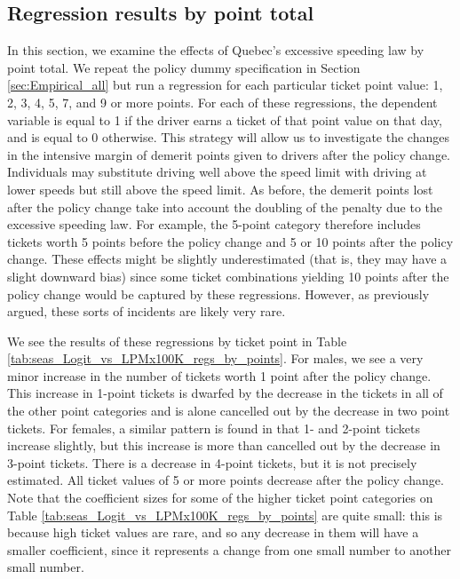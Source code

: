 \subsection{Regression results by point total}
\label{sec:Empirical_by_pts}

In this section, we examine the effects of Quebec’s excessive speeding law by point total. 
We repeat the policy dummy specification in 
Section \ref{sec:Empirical_all} 
but run a regression for each particular ticket point value: 1, 2, 3, 4, 5, 7, and 9 or more points. 
For each of these regressions, the dependent variable is equal to 1 
if the driver earns a ticket of that point value on that day, and is equal to 0 otherwise. 
This strategy will allow us to investigate the changes in the intensive margin of 
demerit points given to drivers after the policy change. 
Individuals may substitute driving well above the speed limit with driving at lower speeds 
but still above the speed limit. 
As before, the demerit points lost after the policy change take into account 
the doubling of the penalty due to the excessive speeding law. 
For example, the 5-point category therefore includes tickets 
worth 5 points before the policy change and 5 or 10 points after the policy change. 
These effects might be slightly underestimated (that is, they may have a slight downward bias) 
since some ticket combinations yielding 10 points after the policy change 
would be captured by these regressions. 
However, as previously argued, these sorts of incidents are likely very rare. 





We see the results of these regressions by ticket point in 
Table \ref{tab:seas_Logit_vs_LPMx100K_regs_by_points}. 
For males, we see a very minor increase in the number of tickets 
worth 1 point after the policy change. 
This increase in 1-point tickets is dwarfed by the decrease in the tickets 
in all of the other point categories and is alone cancelled out 
by the decrease in two point tickets. 
For females, a similar pattern is found in that 1- and 2-point tickets increase slightly,
but this increase is more than cancelled out by the decrease in 3-point tickets. 
There is a decrease in 4-point tickets, but it is not precisely estimated. 
All ticket values of 5 or more points decrease after the policy change. 
Note that the coefficient sizes for some of the higher ticket point categories on 
Table \ref{tab:seas_Logit_vs_LPMx100K_regs_by_points}
are quite small: 
this is because high ticket values are rare, 
and so any decrease in them will have a smaller coefficient, 
since it represents a change from one small number to another small number.

